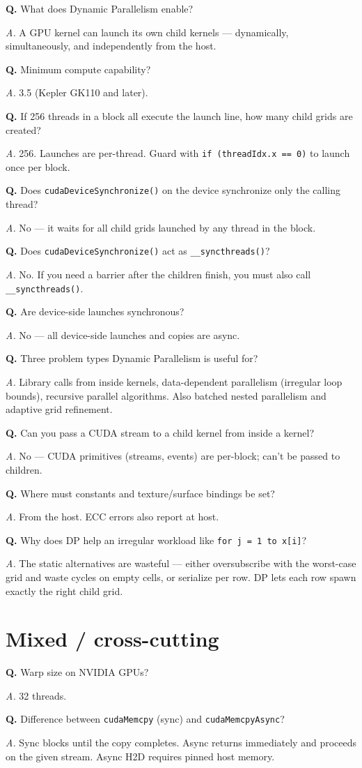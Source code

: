 \documentclass[10pt]{article}
\newcommand{\q}[1]{\par\vspace{6pt}\noindent\textbf{Q.} #1}
\newcommand{\ans}[1]{\par\noindent\textit{A.} #1\par}
\begin{document}
\q{What does Dynamic Parallelism enable?}
\ans{A GPU kernel can launch its own child kernels — dynamically, simultaneously, and independently from the host.}

\q{Minimum compute capability?}
\ans{3.5 (Kepler GK110 and later).}

\q{If 256 threads in a block all execute the launch line, how many child grids are created?}
\ans{256. Launches are per-thread. Guard with \texttt{if (threadIdx.x == 0)} to launch once per block.}

\q{Does \texttt{cudaDeviceSynchronize()} on the device synchronize only the calling thread?}
\ans{No — it waits for all child grids launched by any thread in the block.}

\q{Does \texttt{cudaDeviceSynchronize()} act as \texttt{\_\_syncthreads()}?}
\ans{No. If you need a barrier after the children finish, you must also call \texttt{\_\_syncthreads()}.}

\q{Are device-side launches synchronous?}
\ans{No — all device-side launches and copies are async.}

\q{Three problem types Dynamic Parallelism is useful for?}
\ans{Library calls from inside kernels, data-dependent parallelism (irregular loop bounds), recursive parallel algorithms. Also batched nested parallelism and adaptive grid refinement.}

\q{Can you pass a CUDA stream to a child kernel from inside a kernel?}
\ans{No — CUDA primitives (streams, events) are per-block; can't be passed to children.}

\q{Where must constants and texture/surface bindings be set?}
\ans{From the host. ECC errors also report at host.}

\q{Why does DP help an irregular workload like \texttt{for j = 1 to x[i]}?}
\ans{The static alternatives are wasteful — either oversubscribe with the worst-case grid and waste cycles on empty cells, or serialize per row. DP lets each row spawn exactly the right child grid.}

\hrulefill

\section*{Mixed / cross-cutting}

\q{Warp size on NVIDIA GPUs?}
\ans{32 threads.}

\q{Difference between \texttt{cudaMemcpy} (sync) and \texttt{cudaMemcpyAsync}?}
\ans{Sync blocks until the copy completes. Async returns immediately and proceeds on the given stream. Async H2D requires pinned host memory.}
\end{document}
